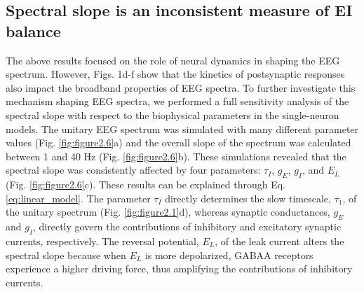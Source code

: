 \subsection{Spectral slope is an inconsistent measure of EI balance}
The above results focused on the role of neural dynamics in shaping the EEG spectrum. However, Figs. 1d-f show that the kinetics of postsynaptic responses also impact the broadband properties of EEG spectra. To further investigate this mechanism shaping EEG spectra, we performed a full sensitivity analysis of the spectral slope with respect to the biophysical parameters in the single-neuron models. The unitary EEG spectrum was simulated with many different parameter values (Fig. \ref{fig:figure2.6}a) and the overall slope of the spectrum was calculated \cite{Donoghue2020} between 1 and 40 \unit{\hertz} (Fig. \ref{fig:figure2.6}b). These simulations revealed that the spectral slope was consistently affected by four parameters: $\tau_I$, $g_E$, $g_I$, and $E_L$ (Fig. \ref{fig:figure2.6}c). These results can be explained through Eq. \ref{eq:linear_model}. The parameter $\tau_I$ directly determines the slow timescale, $\tau_1$, of the unitary spectrum (Fig. \ref{fig:figure2.1}d), whereas synaptic conductances, $g_E$ and $g_I$, directly govern the contributions of inhibitory and excitatory synaptic currents, respectively. The reversal potential, $E_L$, of the leak current alters the spectral slope because when $E_L$ is more depolarized, GABAA receptors experience a higher driving force, thus amplifying the contributions of inhibitory currents. 


